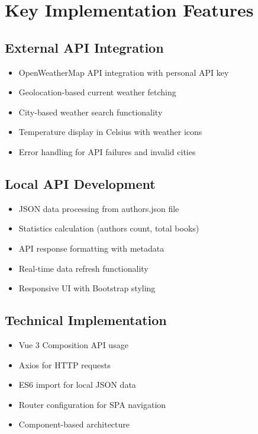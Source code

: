 \documentclass[12pt,a4paper]{article}
\begin{document}
\newpage



\section{Key Implementation Features}

\subsection{External API Integration}
\begin{itemize}
\item OpenWeatherMap API integration with personal API key
\item Geolocation-based current weather fetching
\item City-based weather search functionality
\item Temperature display in Celsius with weather icons
\item Error handling for API failures and invalid cities
\end{itemize}

\subsection{Local API Development}
\begin{itemize}
\item JSON data processing from authors.json file
\item Statistics calculation (authors count, total books)
\item API response formatting with metadata
\item Real-time data refresh functionality
\item Responsive UI with Bootstrap styling
\end{itemize}

\subsection{Technical Implementation}
\begin{itemize}
\item Vue 3 Composition API usage
\item Axios for HTTP requests
\item ES6 import for local JSON data
\item Router configuration for SPA navigation
\item Component-based architecture
\end{itemize}
\end{document}
